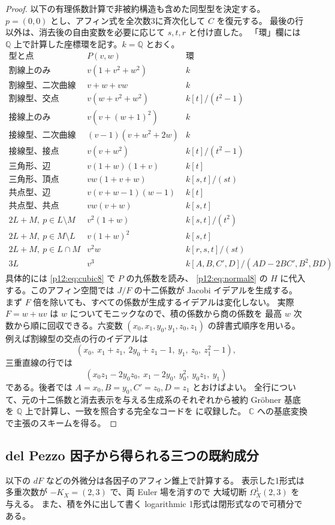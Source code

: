 \begin{proof}
以下の有理係数計算で非被約構造も含めた同型型を決定する。
$p=(0,0)$ とし、アフィン式を全次数3に斉次化して $C$ を復元する。
最後の行以外は、消去後の自由変数を必要に応じて $s,t,r$ と付け直した。
「環」欄には $\mathbb Q$ 上で計算した座標環を記す。$k=\mathbb Q$ とおく。
\[
\begin{array}{lll}
\text{型と点} & P(v,w)&\text{環}\\ \hline
\text{割線上のみ} &v(1+v^2+w^2)& k\\
\text{割線型、二次曲線上のみ} &v+w+vw& k\\
\text{割線型、交点} &v(w+v^2+w^2)& k[t]/(t^2-1)\\
\text{接線上のみ} &v(v+(w+1)^2)&k\\
\text{接線型、二次曲線上のみ} &(v-1)(v+w^2+2w)&k\\
\text{接線型、接点} &v(v+w^2)&k[t]/(t^2-1)\\
\text{三角形、辺} &v(1+w)(1+v)&k[t]\\
\text{三角形、頂点} &vw(1+v+w)&k[s,t]/(st)\\
\text{共点型、辺} &v(v+w-1)(w-1)&k[t]\\
\text{共点型、共点} &vw(v+w)&k[s,t]\\
2L+M,\ p\in L\setminus M & v^2(1+w)&k[s,t]/(t^2)\\
2L+M,\ p\in M\setminus L & v(1+w)^2&k[s,t]\\
2L+M,\ p\in L\cap M &v^2w&k[r,s,t]/(st)\\
3L &v^3& k[A,B,C',D]/(AD-2BC',B^2,BD)
\end{array}
\]
具体的には \eqref{p12:eq:cubic8} で $P$ の九係数を読み、
\eqref{p12:eq:normal8} の $H$ に代入する。このアフィン空間では
$J/F$ の十二係数が Jacobi イデアルを生成する。
まず $F$ 倍を除いても、すべての係数が生成するイデアルは変化しない。
実際 $F=w+uv$ は $w$ についてモニックなので、積の係数から商の係数を
最高 $w$ 次数から順に回収できる。六変数
$(x_0,x_1,y_0,y_1,z_0,z_1)$ の辞書式順序を用いる。
例えば割線型の交点の行のイデアルは
\[
 (x_0,\ x_1+z_1,\ 2y_0+z_1-1,\ y_1,\ z_0,\ z_1^2-1),
\]
三重直線の行では
\[
 (x_0z_1-2y_0z_0,\ x_1-2y_0,\ y_0^2,\ y_0z_1,\ y_1)
\]
である。後者では $A=x_0,B=y_0,C'=z_0,D=z_1$ とおけばよい。
全行について、元の十二係数と消去表示を与える生成系のそれぞれから被約
Gröbner 基底を $\mathbb Q$ 上で計算し、一致を照合する完全なコードを
 に収録した。
$\mathbb C$ への基底変換で主張のスキームを得る。
\end{proof}


\subsection{del Pezzo 因子から得られる三つの既約成分}
以下の $dF$ などの外微分は各因子のアフィン錐上で計算する。
表示した1形式は多重次数が $-K_X=(2,3)$ で、両 Euler 場を消すので
大域切断 $\Omega^1_X(2,3)$ を与える。
また、積を外に出して書く logarithmic 1形式は閉形式なので可積分である\cite[\S3.3]{p12-Pym}。

